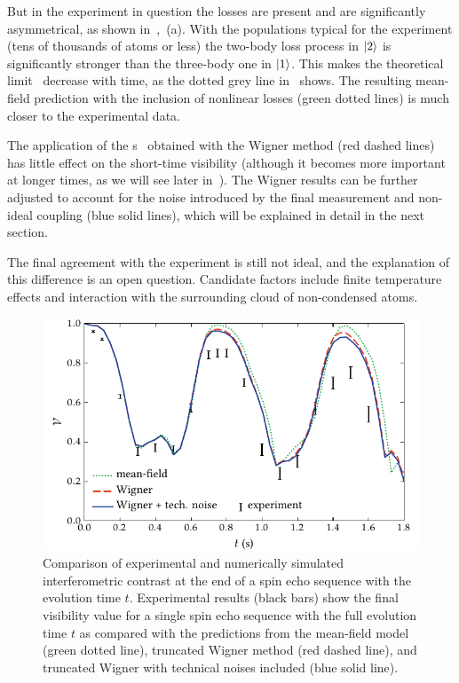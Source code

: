 But in the experiment in question the losses are present and are significantly asymmetrical, as shown in~,~(a).
With the populations typical for the experiment (tens of thousands of atoms or less) the two-body loss process in $\mbox{\ensuremath{\left\vert 2 \right\rangle}}$ is significantly stronger than the three-body one in $\mbox{\ensuremath{\left\vert 1 \right\rangle}}$.
This makes the theoretical limit~ decrease with time, as the dotted grey line in~ shows.
The resulting mean-field prediction with the inclusion of nonlinear losses (green dotted lines) is much closer to the experimental data.

The application of the s~ obtained with the Wigner method (red dashed lines) has little effect on the short-time visibility (although it becomes more important at longer times, as we will see later in~).
The Wigner results can be further adjusted to account for the noise introduced by the final measurement and non-ideal coupling (blue solid lines), which will be explained in detail in the next section.

The final agreement with the experiment is still not ideal, and the explanation of this difference is an open question.
Candidate factors include finite temperature effects and interaction with the surrounding cloud of non-condensed atoms.

\begin{figure}
    \centerline{\includegraphics{figures_generated/bec_noise/echo_visibility_short.pdf}}

    \caption{Comparison of experimental and numerically simulated interferometric contrast at the end of a spin echo sequence with the evolution time $t$.
    Experimental results (black bars) show the final visibility value for a single spin echo sequence with the full evolution time $t$ as compared with the predictions from the mean-field model (green dotted line), truncated Wigner method (red dashed line), and truncated Wigner with technical noises included (blue solid line).}%

    \label{fig:bec-noise:visibility:echo-visibility}
\end{figure}

